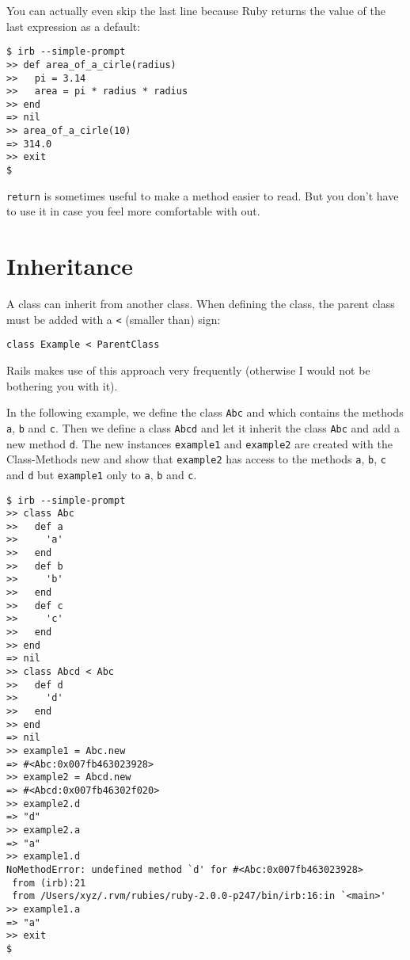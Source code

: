 \documentclass[a4paper]{book}
\newcounter{tab}[chapter]
\begin{document}
You can actually even skip the last line because Ruby returns the value of the last expression as a default:

\begin{shaded}\begin{verbatim}
$ irb --simple-prompt
>> def area_of_a_cirle(radius)
>>   pi = 3.14
>>   area = pi * radius * radius
>> end
=> nil
>> area_of_a_cirle(10)
=> 314.0
>> exit
$
\end{verbatim}\end{shaded}

\texttt{return} is sometimes useful to make a method easier to read. But you don't have to use it in case you feel more comfortable with out.

\section{Inheritance}\label{inheritance}

A class can inherit from another class. When defining the class, the parent class must be added with a \texttt{\textless{}} (smaller than) sign:

\begin{shaded}\begin{verbatim}
class Example < ParentClass
\end{verbatim}\end{shaded}

Rails makes use of this approach very frequently (otherwise I would not be bothering you with it).

In the following example, we define the class \texttt{Abc} and which contains the methods \texttt{a}, \texttt{b} and \texttt{c}. Then we define a class \texttt{Abcd} and let it inherit the class \texttt{Abc} and add a new method \texttt{d}. The new instances \texttt{example1} and \texttt{example2} are created with the Class-Methods new and show that \texttt{example2} has access to the methods \texttt{a}, \texttt{b}, \texttt{c} and \texttt{d} but \texttt{example1} only to \texttt{a}, \texttt{b} and \texttt{c}.

\begin{shaded}\begin{verbatim}
$ irb --simple-prompt
>> class Abc
>>   def a
>>     'a'
>>   end
>>   def b
>>     'b'
>>   end
>>   def c
>>     'c'
>>   end
>> end
=> nil
>> class Abcd < Abc
>>   def d
>>     'd'
>>   end
>> end
=> nil
>> example1 = Abc.new
=> #<Abc:0x007fb463023928>
>> example2 = Abcd.new
=> #<Abcd:0x007fb46302f020>
>> example2.d
=> "d"
>> example2.a
=> "a"
>> example1.d
NoMethodError: undefined method `d' for #<Abc:0x007fb463023928>
 from (irb):21
 from /Users/xyz/.rvm/rubies/ruby-2.0.0-p247/bin/irb:16:in `<main>'
>> example1.a
=> "a"
>> exit
$
\end{verbatim}\end{shaded}
\end{document}

